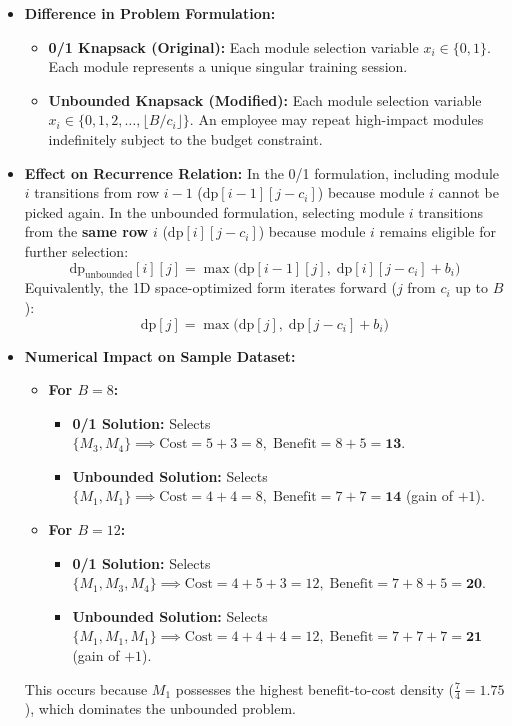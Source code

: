 \documentclass[12pt]{article}
\begin{document}
\begin{itemize}
    \item \textbf{Difference in Problem Formulation:}
    \begin{itemize}
        \item \textbf{0/1 Knapsack (Original):} Each module selection variable $x_i \in \{0, 1\}$. Each module represents a unique singular training session.
        \item \textbf{Unbounded Knapsack (Modified):} Each module selection variable $x_i \in \{0, 1, 2, \dots, \lfloor B / c_i \rfloor\}$. An employee may repeat high-impact modules indefinitely subject to the budget constraint.
    \end{itemize}

    \item \textbf{Effect on Recurrence Relation:}
    In the 0/1 formulation, including module $i$ transitions from row $i-1$ ($\text{dp}[i-1][j - c_i]$) because module $i$ cannot be picked again. In the unbounded formulation, selecting module $i$ transitions from the \textbf{same row} $i$ ($\text{dp}[i][j - c_i]$) because module $i$ remains eligible for further selection:
    \[
    \text{dp}_{\text{unbounded}}[i][j] = \max\Big(\text{dp}[i-1][j], \; \text{dp}[i][j - c_i] + b_i\Big)
    \]
    Equivalently, the 1D space-optimized form iterates forward ($j$ from $c_i$ up to $B$):
    \[
    \text{dp}[j] = \max\big(\text{dp}[j], \; \text{dp}[j - c_i] + b_i\big)
    \]

    \item \textbf{Numerical Impact on Sample Dataset:}
    \begin{itemize}
        \item \textbf{For $B = 8$:}
        \begin{itemize}
            \item \textbf{0/1 Solution:} Selects $\{M_3, M_4\} \implies \text{Cost} = 5+3=8, \; \text{Benefit} = 8+5=\mathbf{13}$.
            \item \textbf{Unbounded Solution:} Selects $\{M_1, M_1\} \implies \text{Cost} = 4+4=8, \; \text{Benefit} = 7+7=\mathbf{14}$ (gain of $+1$).
        \end{itemize}
        \item \textbf{For $B = 12$:}
        \begin{itemize}
            \item \textbf{0/1 Solution:} Selects $\{M_1, M_3, M_4\} \implies \text{Cost} = 4+5+3=12, \; \text{Benefit} = 7+8+5=\mathbf{20}$.
            \item \textbf{Unbounded Solution:} Selects $\{M_1, M_1, M_1\} \implies \text{Cost} = 4+4+4=12, \; \text{Benefit} = 7+7+7=\mathbf{21}$ (gain of $+1$).
        \end{itemize}
    \end{itemize}
    This occurs because $M_1$ possesses the highest benefit-to-cost density ($\frac{7}{4} = 1.75$), which dominates the unbounded problem.
\end{itemize}
\end{document}
